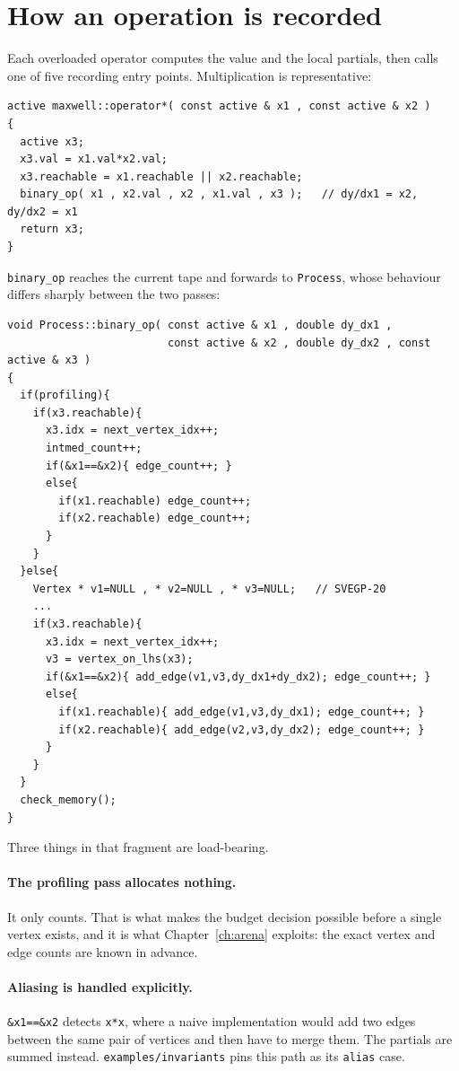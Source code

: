 \documentclass[11pt,a4paper]{report}
\newcommand{\code}[1]{\texttt{#1}}
\begin{document}
\section{How an operation is recorded}

Each overloaded operator computes the value and the local partials, then calls
one of five recording entry points. Multiplication is representative:

\begin{lstlisting}
active maxwell::operator*( const active & x1 , const active & x2 )
{
  active x3;
  x3.val = x1.val*x2.val;
  x3.reachable = x1.reachable || x2.reachable;
  binary_op( x1 , x2.val , x2 , x1.val , x3 );   // dy/dx1 = x2, dy/dx2 = x1
  return x3;
}
\end{lstlisting}

\code{binary\_op} reaches the current tape and forwards to \code{Process}, whose
behaviour differs sharply between the two passes:

\begin{lstlisting}
void Process::binary_op( const active & x1 , double dy_dx1 ,
                         const active & x2 , double dy_dx2 , const active & x3 )
{
  if(profiling){
    if(x3.reachable){
      x3.idx = next_vertex_idx++;
      intmed_count++;
      if(&x1==&x2){ edge_count++; }
      else{
        if(x1.reachable) edge_count++;
        if(x2.reachable) edge_count++;
      }
    }
  }else{
    Vertex * v1=NULL , * v2=NULL , * v3=NULL;   // SVEGP-20
    ...
    if(x3.reachable){
      x3.idx = next_vertex_idx++;
      v3 = vertex_on_lhs(x3);
      if(&x1==&x2){ add_edge(v1,v3,dy_dx1+dy_dx2); edge_count++; }
      else{
        if(x1.reachable){ add_edge(v1,v3,dy_dx1); edge_count++; }
        if(x2.reachable){ add_edge(v2,v3,dy_dx2); edge_count++; }
      }
    }
  }
  check_memory();
}
\end{lstlisting}

Three things in that fragment are load-bearing.

\paragraph{The profiling pass allocates nothing.} It only counts. That is what
makes the budget decision possible before a single vertex exists, and it is
what Chapter~\ref{ch:arena} exploits: the exact vertex and edge counts are known
in advance.

\paragraph{Aliasing is handled explicitly.} \code{\&x1==\&x2} detects
\code{x*x}, where a naive implementation would add two edges between the same
pair of vertices and then have to merge them. The partials are summed instead.
\code{examples/invariants} pins this path as its \code{alias} case.
\end{document}
